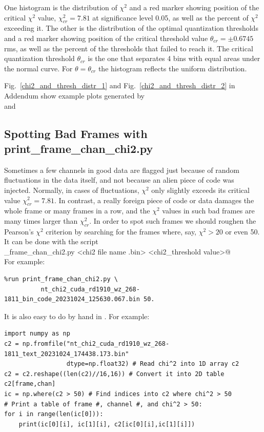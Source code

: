 \documentclass[letterpaper,twoside,12pt]{article}
\begin{document}
One histogram is the distribution of $\chi^2$ and a red marker showing position of the critical $\chi^2$ value,  $\chi^2_{cr} = 7.81$ at significance level 0.05, as well as the percent of $\chi^2$ exceeding it. The other is the distribution of the optimal quantization thresholds and a red marker showing position of the critical threshold value $\theta_{cr} = \pm 0.6745$ rms, as well as the percent of the thresholds that failed to reach it. The critical quantization threshold $\theta_{cr}$ is the one that separates 4 bins with equal areas under the normal curve. For $\theta = \theta_{cr}$ the histogram reflects the uniform distribution. 

Fig.~\ref{chi2_and_thresh_distr_1} and Fig.~\ref{chi2_and_thresh_distr_2} in Addendum show example plots generated by \\
\noindent \verb@%run plot_m5b_hist.py rd1903_ft_100-0950.m5b 025@ \\
\indent and \\
\noindent \verb@%run plot_m5b_hist.py rd1910_wz_268-1811.m5b 793@.


\subsection{Spotting Bad Frames with print\_frame\_chan\_chi2.py}

Sometimes a few channels in good data are flagged just because of random fluctuations in the data itself, and not because an alien piece of code was injected. Normally, in cases of fluctuations, $\chi^2$ only slightly exceeds its critical value $\chi^2_{cr} = 7.81$. In contrast, a really foreign piece of code or data damages the whole frame or many frames in a row, and the $\chi^2$ values in such bad frames are many times larger than $\chi^2_{cr}$. In order to spot such frames we should roughen the Pearson's $\chi^2$ criterion by searching for the frames where, say, $\chi^2 > 20$ or even 50. It can be done with the script \\

\noindent \verb@print_frame_chan_chi2.py <chi2 file name .bin> <chi2_threshold value>@ \\

\noindent For example:
\begin{verbatim}
%run print_frame_chan_chi2.py \
          nt_chi2_cuda_rd1910_wz_268-1811_bin_code_20231024_125630.067.bin 50.
\end{verbatim}

It is also easy to do by hand in \verb@IPython@. For example: 
\begin{verbatim}
import numpy as np
c2 = np.fromfile("nt_chi2_cuda_rd1910_wz_268-1811_text_20231024_174438.173.bin"
                 dtype=np.float32) # Read chi^2 into 1D array c2
c2 = c2.reshape((len(c2)//16,16)) # Convert it into 2D table c2[frame,chan]
ic = np.where(c2 > 50) # Find indices into c2 where chi^2 > 50
# Print a table of frame #, channel #, and chi^2 > 50:
for i in range(len(ic[0])):
    print(ic[0][i], ic[1][i], c2[ic[0][i],ic[1][i]])
\end{verbatim}
\end{document}
